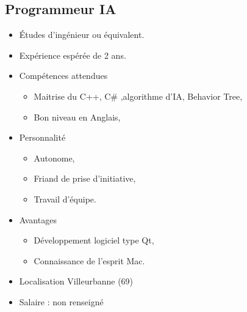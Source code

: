 \documentclass[12pt, a4paper]{report} %
\begin{document}
\subsection{Programmeur IA}
\begin{itemize}
\item Études d'ingénieur ou équivalent.
\item Expérience espérée de 2 ans.
\item Compétences attendues  
  \begin{itemize}
    \item  Maitrise du C++, C\# ,algorithme d'IA, Behavior Tree,
    \item  Bon niveau en Anglais,
  \end{itemize}
\item Personnalité 
  \begin{itemize}
    \item Autonome,
    \item Friand de prise d'initiative,
    \item Travail d'équipe.
  \end{itemize}
\item Avantages 
  \begin{itemize}
    \item Développement logiciel type Qt,
    \item Connaissance de l'esprit Mac.
  \end{itemize}
\item Localisation  Villeurbanne (69)
\item Salaire : non renseigné
\end{itemize}
\end{document}
